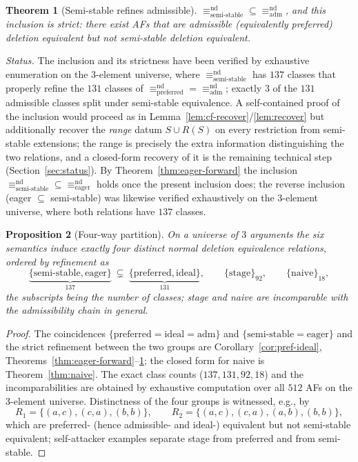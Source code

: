 \documentclass{amsart}
\newtheorem{theorem}{Theorem}
\newtheorem{proposition}[theorem]{Proposition}
\theoremstyle{remark}
\begin{document}
\begin{theorem}[Semi-stable refines admissible]\label{thm:ss-adm}
$\equiv^{\mathrm{nd}}_{\mathrm{semi\text{-}stable}}\subseteq
\equiv^{\mathrm{nd}}_{\mathrm{adm}}$, and this inclusion is \emph{strict}: there
exist AFs that are admissible (equivalently preferred) deletion equivalent but
not semi-stable deletion equivalent.
\end{theorem}

\noindent\emph{Status.}  The inclusion and its strictness have been verified by
exhaustive enumeration on the $3$-element universe, where
$\equiv^{\mathrm{nd}}_{\mathrm{semi\text{-}stable}}$ has $137$ classes that
properly refine the $131$ classes of
$\equiv^{\mathrm{nd}}_{\mathrm{preferred}}=\equiv^{\mathrm{nd}}_{\mathrm{adm}}$;
exactly $3$ of the $131$ admissible classes split under semi-stable equivalence.
A self-contained proof of the inclusion would proceed as in
Lemma~\ref{lem:cf-recover}/\ref{lem:recover} but additionally recover the
\emph{range} datum $S\cup R(S)$ on every restriction from semi-stable
extensions; the range is precisely the extra information distinguishing the two
relations, and a closed-form recovery of it is the remaining technical step
(Section~\ref{sec:status}).  By Theorem~\ref{thm:eager-forward} the inclusion
$\equiv^{\mathrm{nd}}_{\mathrm{semi\text{-}stable}}\subseteq
\equiv^{\mathrm{nd}}_{\mathrm{eager}}$ holds once the present inclusion does; the
reverse inclusion (eager $\subseteq$ semi-stable) was likewise verified
exhaustively on the $3$-element universe, where both relations have $137$
classes.

\begin{proposition}[Four-way partition]\label{prop:partition}
On a universe of $3$ arguments the six semantics induce exactly four distinct
normal deletion equivalence relations, ordered by refinement as
\[
\underbrace{\{\mathrm{semi\text{-}stable},\mathrm{eager}\}}_{137}
\ \subsetneq\
\underbrace{\{\mathrm{preferred},\mathrm{ideal}\}}_{131},
\qquad
\{\mathrm{stage}\}_{92},
\qquad
\{\mathrm{naive}\}_{18},
\]
the subscripts being the number of classes; stage and naive are incomparable
with the admissibility chain in general.
\end{proposition}

\begin{proof}
The coincidences $\{\mathrm{preferred}=\mathrm{ideal}=\mathrm{adm}\}$ and
$\{\mathrm{semi\text{-}stable}=\mathrm{eager}\}$ and the strict refinement
between the two groups are Corollary~\ref{cor:pref-ideal},
Theorems~\ref{thm:eager-forward}--\ref{thm:ss-adm}; the closed form for naive is
Theorem~\ref{thm:naive}.  The exact class counts ($137,131,92,18$) and the
incomparabilities are obtained by exhaustive computation over all $512$ AFs on
the $3$-element universe.  Distinctness of the four groups is witnessed, e.g., by
\[
R_1=\{(a,c),(c,a),(b,b)\},\qquad
R_2=\{(a,c),(c,a),(a,b),(b,b)\},
\]
which are preferred- (hence admissible- and ideal-) equivalent but not
semi-stable equivalent; self-attacker examples separate stage from preferred and
from semi-stable.
\end{proof}
\end{document}
